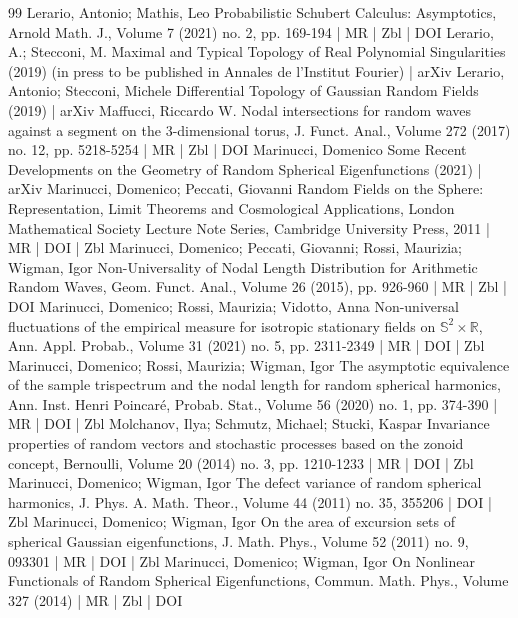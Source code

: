 \begin{thebibliography}{99}
Lerario, Antonio; Mathis, Leo Probabilistic Schubert Calculus: Asymptotics, Arnold Math. J., Volume 7 (2021) no. 2, pp. 169-194 | MR | Zbl | DOI
Lerario, A.; Stecconi, M. Maximal and Typical Topology of Real Polynomial Singularities (2019) (in press to be published in Annales de l’Institut Fourier) | arXiv
Lerario, Antonio; Stecconi, Michele Differential Topology of Gaussian Random Fields (2019) | arXiv
Maffucci, Riccardo W. Nodal intersections for random waves against a segment on the 3-dimensional torus, J. Funct. Anal., Volume 272 (2017) no. 12, pp. 5218-5254 | MR | Zbl | DOI
Marinucci, Domenico Some Recent Developments on the Geometry of Random Spherical Eigenfunctions (2021) | arXiv
Marinucci, Domenico; Peccati, Giovanni Random Fields on the Sphere: Representation, Limit Theorems and Cosmological Applications, London Mathematical Society Lecture Note Series, Cambridge University Press, 2011 | MR | DOI | Zbl
Marinucci, Domenico; Peccati, Giovanni; Rossi, Maurizia; Wigman, Igor Non-Universality of Nodal Length Distribution for Arithmetic Random Waves, Geom. Funct. Anal., Volume 26 (2015), pp. 926-960 | MR | Zbl | DOI
Marinucci, Domenico; Rossi, Maurizia; Vidotto, Anna Non-universal fluctuations of the empirical measure for isotropic stationary fields on ${\mathbb{S}^{2}}\times \mathbb{R}$, Ann. Appl. Probab., Volume 31 (2021) no. 5, pp. 2311-2349 | MR | DOI | Zbl
Marinucci, Domenico; Rossi, Maurizia; Wigman, Igor The asymptotic equivalence of the sample trispectrum and the nodal length for random spherical harmonics, Ann. Inst. Henri Poincaré, Probab. Stat., Volume 56 (2020) no. 1, pp. 374-390 | MR | DOI | Zbl
Molchanov, Ilya; Schmutz, Michael; Stucki, Kaspar Invariance properties of random vectors and stochastic processes based on the zonoid concept, Bernoulli, Volume 20 (2014) no. 3, pp. 1210-1233 | MR | DOI | Zbl
Marinucci, Domenico; Wigman, Igor The defect variance of random spherical harmonics, J. Phys. A. Math. Theor., Volume 44 (2011) no. 35, 355206 | DOI | Zbl
Marinucci, Domenico; Wigman, Igor On the area of excursion sets of spherical Gaussian eigenfunctions, J. Math. Phys., Volume 52 (2011) no. 9, 093301 | MR | DOI | Zbl
Marinucci, Domenico; Wigman, Igor On Nonlinear Functionals of Random Spherical Eigenfunctions, Commun. Math. Phys., Volume 327 (2014) | MR | Zbl | DOI

\end{thebibliography}

